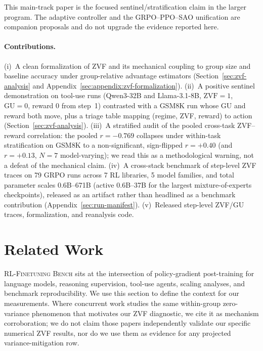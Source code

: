 \documentclass{article}
\newcommand{\ours}{\textsc{RL-Finetuning Bench}}
\begin{document}
This main-track paper is the focused sentinel/stratification claim in the larger
program. The adaptive controller and the GRPO--PPO--SAO unification are companion
proposals and do not upgrade the evidence reported here.

\paragraph{Contributions.}
(i)~A clean formalization of ZVF and its mechanical coupling to group size
and baseline accuracy under group-relative advantage estimators
(Section~\ref{sec:zvf-analysis} and Appendix~\ref{sec:appendix:zvf-formalization}).
(ii)~A positive sentinel demonstration on tool-use runs (Qwen3-32B and
Llama-3.1-8B, $\mathrm{ZVF}{=}1$, $\mathrm{GU}{=}0$, reward $0$ from step~1)
contrasted with a GSM8K run whose GU and reward both move, plus a triage
table mapping (regime, ZVF, reward) to action
(Section~\ref{sec:zvf-analysis}).
(iii)~A stratified audit of the pooled cross-task ZVF--reward correlation:
the pooled $r{=}-0.769$ collapses under within-task stratification on
GSM8K to a non-significant, sign-flipped $r{=}+0.40$ (and $r{=}+0.13$,
$N{=}7$ model-varying); we read this as a methodological warning, not a
defeat of the mechanical claim.
(iv)~A cross-stack benchmark of step-level ZVF traces on 79 GRPO runs across
7 RL libraries, 5 model families, and total parameter scales 0.6B--671B
(active 0.6B--37B for the largest mixture-of-experts checkpoints), released
as an artifact rather than headlined as a benchmark contribution
(Appendix~\ref{sec:run-manifest}).
(v)~Released step-level ZVF/GU traces, formalization, and reanalysis code.
 


\section{Related Work}
\label{sec:related}

\ours{} sits at the intersection of policy-gradient post-training for
language models, reasoning supervision, tool-use agents, scaling analyses, and
benchmark reproducibility. We use this section to define the context for our
measurements. Where concurrent work studies the same within-group
zero-variance phenomenon that motivates our ZVF diagnostic, we cite it as
mechanism corroboration; we do not claim those papers independently validate
our specific numerical ZVF results, nor do we use them as evidence for any
projected variance-mitigation row.
\end{document}

